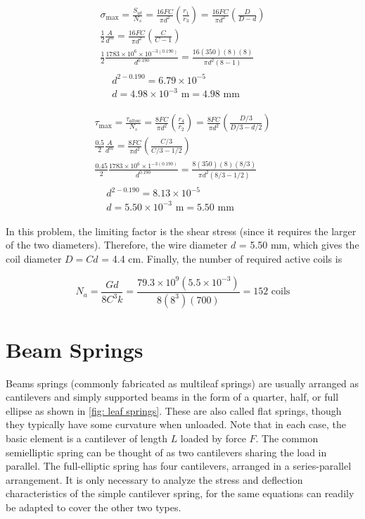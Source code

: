 \documentclass[a4paper,openany,12pt]{book}
\begin{document}
{{$$\begin{gathered}
  \sigma_{\max} = \frac{S_{ut}}{N_s} = \frac{16FC}{\pi d^2}\left( \frac{r_1}{r_3} \right) = \frac{16FC}{\pi d^2}\left( \frac{D}{D - d} \right) \\
  \frac{1}{2}\frac{A}{d^m} = \frac{16FC}{\pi d^2}\left( \frac{C}{C - 1} \right) \\ 
  \frac{1}{2}\frac{1783 \times 10^6 \times 10^{-3(0.190)}}{d^{0.190}} = \frac{16(350)(8)(8)}{\pi d^2(8 - 1)} \\
  \begin{aligned}
  &d^{2 - 0.190} = 6.79 \times 10^{-5} \\ 
  &d = 4.98 \times 10^{-3}\text{ m} = 4.98\text{ mm}
  \end{aligned}\end{gathered}$$

$$\begin{gathered}
  \tau_{\max} = \frac{\tau_{allow}}{N_s} = \frac{8FC}{\pi d^2}\left( \frac{r_4}{r_2} \right) = \frac{8FC}{\pi d^2}\left( \frac{D/3}{D/3 - d/2} \right) \\ 
  \frac{0.5}{2}\frac{A}{d^m} = \frac{8FC}{\pi d^2}\left( \frac{C/3}{C/3 - 1/2} \right) \\ 
  \frac{0.45}{2}\frac{1783 \times 10^6 \times 1^{-3(0.190)}}{d^{0.190}} = \frac{8(350)(8)(8/3)}{\pi d^2(8/3 - 1/2)} \\
  \begin{aligned}
  &d^{2 - 0.190} = 8.13 \times 10^{-5} \\ 
  &d = 5.50 \times 10^{-3}\text{ m} = 5.50 \text{ mm}
  \end{aligned}\end{gathered}$$

In this problem, the limiting factor is the shear stress (since it
requires the larger of the two diameters). Therefore, the wire diameter
\(d\) = 5.50 mm, which gives the coil diameter \(D = Cd\) = 4.4 cm. Finally,
the number of required active coils is

$$N_a = \frac{Gd}{8C^3k} = \frac{79.3 \times 10^9(5.5 \times 10^{-3})}{8(8^3)(700)} = 152\text{ coils}$$

\section{Beam Springs}
\label{beam-springs}
Beams springs (commonly fabricated as multileaf springs) are usually
arranged as cantilevers and simply supported beams in the form of a
quarter, half, or full ellipse as shown in
\ref{fig: leaf springs}. These are also called flat
springs, though they typically have some curvature when unloaded. Note
that in each case, the basic element is a cantilever of length \(L\)
loaded by force \(F\). The common semielliptic spring can be thought of as
two cantilevers sharing the load in parallel. The full-elliptic spring
has four cantilevers, arranged in a series-parallel arrangement. It is
only necessary to analyze the stress and deflection characteristics of
the simple cantilever spring, for the same equations can readily be
adapted to cover the other two types.

}}
\end{document}
